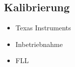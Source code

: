 \subsection{Kalibrierung}
\begin{frame}
  \begin{itemize}
    \item Texas Instruments \pause
    \item Inbetriebnahme \pause
    \item FLL
  \end{itemize}
\end{frame}
